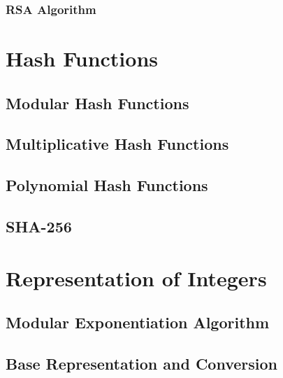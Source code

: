 \documentclass[oneside]{book}
\begin{document}
\subsubsection{RSA Algorithm}
\section{Hash Functions}
\subsection{Modular Hash Functions}
\subsection{Multiplicative Hash Functions}
\subsection{Polynomial Hash Functions}
\subsection{SHA-256}
\section{Representation of Integers}
\subsection{Modular Exponentiation Algorithm}
\subsection{Base Representation and Conversion}

\nocite{*}
\printbibliography
\end{document}
